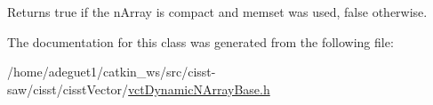 \begin{DoxyReturn}{Returns}
true if the n\-Array is compact and memset was used, false otherwise. 
\end{DoxyReturn}


The documentation for this class was generated from the following file\-:\begin{DoxyCompactItemize}
\item 
/home/adeguet1/catkin\-\_\-ws/src/cisst-\/saw/cisst/cisst\-Vector/\hyperlink{vct_dynamic_n_array_base_8h}{vct\-Dynamic\-N\-Array\-Base.\-h}\end{DoxyCompactItemize}
